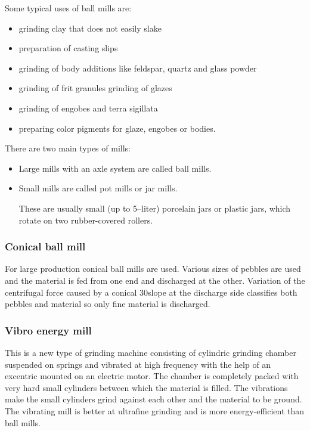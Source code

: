 Some typical uses of ball mills are:
\begin{itemize}
\item grinding clay that does not easily slake
\item preparation of casting slips
\item grinding of body additions like feldspar, quartz and glass powder
\item grinding of frit granules grinding of glazes
\item grinding of engobes and terra sigillata
\item preparing color pigments for glaze, engobes or bodies.
\end{itemize}
There are two main types of mills:
\begin{itemize}
  \item Large mills with an axle system are called ball mills.
  \item Small mills are called pot mills or jar mills.
  
  These are usually small (up to 5--liter) porcelain jars or plastic jars, 
  which 
  rotate on two rubber-covered rollers.
\end{itemize}
\subsubsection{Conical ball mill}
For large production conical ball mills are used. Various sizes of pebbles are 
used and the material is fed from one end and discharged at the other. 
Variation of the centrifugal force caused by a conical 30\degree slope at the 
discharge side classifies both pebbles and material so only fine material is 
discharged.
\subsubsection{Vibro energy mill}
This is a new type of grinding machine consisting of cylindric grinding chamber 
suspended on springs and vibrated at high frequency with the help of an 
excentric mounted on an electric motor. The chamber is completely packed with 
very hard small cylinders between which the material is filled. The vibrations 
make the small cylinders grind against each other and the material to be 
ground. The vibrating mill is better at ultrafine grinding and is more 
energy-efficient than ball mills.
